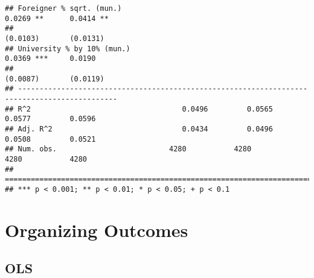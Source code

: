 \documentclass[
]{article}
\begin{document}
\begin{verbatim}
## Foreigner % sqrt. (mun.)                                            0.0269 **      0.0414 ** 
##                                                                    (0.0103)       (0.0131)   
## University % by 10% (mun.)                                          0.0369 ***     0.0190    
##                                                                    (0.0087)       (0.0119)   
## ---------------------------------------------------------------------------------------------
## R^2                                   0.0496         0.0565         0.0577         0.0596    
## Adj. R^2                              0.0434         0.0496         0.0508         0.0521    
## Num. obs.                          4280           4280           4280           4280         
## =============================================================================================
## *** p < 0.001; ** p < 0.01; * p < 0.05; + p < 0.1
\end{verbatim}

\hypertarget{organizing-outcomes}{%
\section{Organizing Outcomes}\label{organizing-outcomes}}

\hypertarget{ols}{%
\subsection{OLS}\label{ols}}
\end{document}
